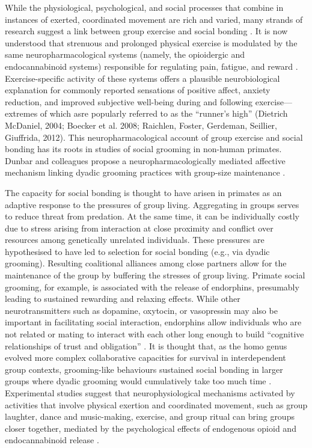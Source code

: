 While the physiological, psychological, and social processes that combine in instances of exerted, coordinated movement are rich and varied, many strands of research suggest a link between group exercise and social bonding \citep{Davis2015,Cohen2017}. It is now understood that strenuous and prolonged physical exercise is modulated by the same neuropharmacological systems (namely, the opioidergic and endocannabinoid systems) responsible for regulating pain, fatigue, and reward \citep{Boecker2008,Raichlen2013}.
Exercise-specific activity of these systems offers a plausible neurobiological explanation for commonly reported sensations of positive affect, anxiety reduction, and improved subjective well-being during and following exercise---extremes of which asre popularly referred to as the ``runner's high'' (Dietrich  McDaniel, 2004; Boecker et al. 2008; Raichlen, Foster, Gerdeman, Seillier,  Giuffrida, 2012).  This neuropharmacological account of group exercise and social bonding has its roots in studies of social grooming in non-human primates.  Dunbar and colleagues propose a neuropharmacologically mediated affective mechanism linking dyadic grooming practices with group-size maintenance \citep{Machin2011}.

The capacity for social bonding is thought to have arisen in primates as an adaptive response to the pressures of group living.  Aggregating in groups serves to reduce threat from predation.  At the same time, it can be individually costly due to stress arising from interaction at close proximity and conflict over resources among genetically unrelated individuals.  These pressures are hypothesised to have led to selection for social bonding (e.g., via dyadic grooming). Resulting coalitional alliances among close partners allow for the maintenance of the group by buffering the stresses of group living.  Primate social grooming, for example, is associated with the release of endorphins, presumably leading to sustained rewarding and relaxing effects.  While other neurotransmitters such as dopamine, oxytocin, or vasopressin may also be important in facilitating social interaction, endorphins allow individuals who are not related or mating to interact with each other long enough to build ``cognitive relationships of trust and obligation'' \citep[1839]{Dunbar2012}.  It is thought that, as the homo genus evolved more complex collaborative capacities for survival in interdependent group contexts, grooming-like behaviours sustained social bonding in larger groups where dyadic grooming would cumulatively take too much time \citep{Dunbar2012}.
Experimental studies suggest that neurophysiological mechanisms activated by activities that involve physical exertion and coordinated movement, such as group laughter, dance and music-making, exercise, and group ritual can bring groups closer together, mediated by the psychological effects of endogenous opioid and endocannabinoid release \citep{Cohen2009,Fischer2014a,Fischer2014,Sullivan2014,Tarr2016,Tarr2015}.

